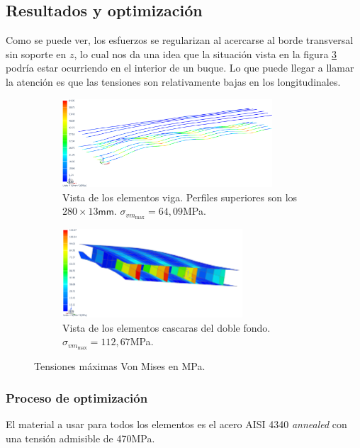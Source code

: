\documentclass[onecolumn,10pt,titlepage]{article}
\newcommand{\unit}[1]{\textsf{#1}}
\newcommand{\mega}{\unit{M}}
\newcommand{\milli}{\unit{m}}
\newcommand{\meter}{\unit{m}}
\newcommand{\pascal}{\unit{Pa}}
\newcommand{\si}[1]{#1}
\newcommand{\SI}[2]{#1\si{#2}}
\begin{document}
\subsection{Resultados y optimización}
Como se puede ver, los esfuerzos se regularizan al acercarse al borde transversal sin soporte en $z$, lo cual nos da una idea que la situación vista en la figura \ref{fig:2a} podría estar ocurriendo en el interior de un buque. Lo que puede llegar a llamar la atención es que las tensiones son relativamente bajas en los longitudinales.


 \begin{figure}[htb!]
 \centering
 \begin{subfigure}{0.49\textwidth}
 \begin{framed}
 \includegraphics[height=3.3cm]{fig/longitudinales_a.png}
 \caption{Vista de los elementos viga. Perfiles superiores son los $280\times 13\si{\milli \meter}$. $\sigma_{vm_{\max}}= 64,09 $\si{\mega \pascal}.}
 \label{fig:longitudinalesCasoA}
 \end{framed}
 \end{subfigure}
 \begin{subfigure}{0.49\textwidth}
 \begin{framed}
 \includegraphics[height=3.3cm]{fig/varengas_a.png}
 \caption{Vista de los elementos cascaras del doble fondo. $\sigma_{vm_{\max}}= 112,67 $\si{\mega \pascal}.}
 \label{fig:VarengasCasoA}
 \end{framed}
 \end{subfigure}
 \caption{Tensiones máximas Von Mises en \si{\mega \pascal}.}
 \label{fig:2a}
 \end{figure}

\subsubsection*{Proceso de optimización}
El material a usar para todos los elementos es el acero AISI 4340 \emph{annealed} con una tensión admisible de \SI{470}{\mega \pascal}.
\end{document}
